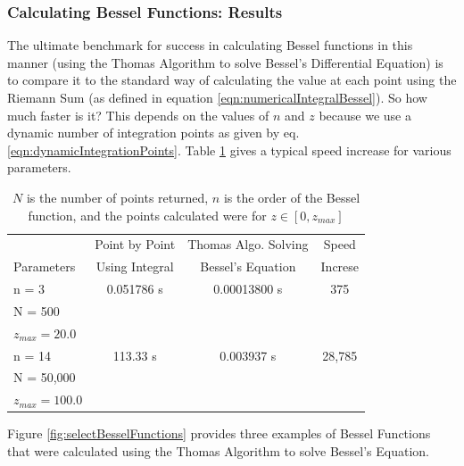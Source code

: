 \documentclass[onecolumn, groupedaddress, 10pt]{revtex4-1}
\begin{document}
\subsubsection{Calculating Bessel Functions: Results}
The ultimate benchmark for success in calculating Bessel functions in this manner (using the Thomas Algorithm to solve Bessel's Differential Equation) is to compare it to the standard way of calculating the value at each point using the Riemann Sum (as defined in equation \ref{eqn:numericalIntegralBessel}).  So how much faster is it?  This depends on the values of $n$ and $z$ because we use a dynamic number of integration points as given by eq. \ref{eqn:dynamicIntegrationPoints}. Table \ref{table:besselSpeed} gives a typical speed increase for various parameters.

\begin{table}[H]
	\centering
	\begin{tabular}{l || c | c | c }
		                  & Point by Point & Thomas Algo. Solving &  Speed	\\
		Parameters        & Using Integral &  Bessel's Equation   & Increse	\\
		\hline
		\hline
		n = 3             &   0.051786 s   &      0.00013800 s    &   375		\\
		N = 500           &                &                      &			\\
		$z_{max} = 20.0$  &                &                      &			\\
		\hline
		n = 14            &     113.33 s   &       0.003937 s     & 28,785	\\
		N = 50,000        &                &                      &           \\
		$z_{max} = 100.0$ &                &                      &           \\
	\end{tabular}
	\caption{\label{table:besselSpeed} $N$ is the number of points returned, $n$ is the order of the Bessel function, and the points calculated were for $z \in [0,z_{max}]$ }
\end{table}

Figure \ref{fig:selectBesselFunctions} provides three examples of Bessel Functions that were calculated using the Thomas Algorithm to solve Bessel's Equation.
\end{document}
